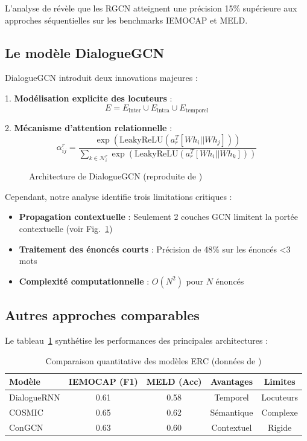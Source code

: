 \documentclass[a4paper,11pt]{article}
\begin{document}
L'analyse de \cite{zhang2021graph} révèle que les RGCN atteignent une précision 15\% supérieure aux approches séquentielles sur les benchmarks IEMOCAP et MELD.

\subsection{Le modèle DialogueGCN}
DialogueGCN \cite{ghosal2019dialoguegcn} introduit deux innovations majeures :

1. \textbf{Modélisation explicite des locuteurs} :
\[
E = E_{\text{inter}} \cup E_{\text{intra}} \cup E_{\text{temporel}}
\]

2. \textbf{Mécanisme d'attention relationnelle} :
\[
\alpha_{ij}^r = \frac{\exp(\text{LeakyReLU}(a_r^T[Wh_i||Wh_j]))}{\sum_{k\in\mathcal{N}_i^r}\exp(\text{LeakyReLU}(a_r^T[Wh_i||Wh_k]))}
\]

\begin{figure}[htbp]
    \centering
    \caption{Architecture de DialogueGCN (reproduite de \cite{ghosal2019dialoguegcn})}
    \label{fig:dialoguegcn}
\end{figure}

Cependant, notre analyse identifie trois limitations critiques :

\begin{itemize}
    \item \textbf{Propagation contextuelle} : Seulement 2 couches GCN limitent la portée contextuelle (voir Fig.~\ref{fig:dialoguegcn})
    \item \textbf{Traitement des énoncés courts} : Précision de 48\% sur les énoncés <3 mots \cite{li2021survey}
    \item \textbf{Complexité computationnelle} : $O(N^2)$ pour $N$ énoncés
\end{itemize}

\subsection{Autres approches comparables}
Le tableau~\ref{tab:model_comparison} synthétise les performances des principales architectures :

\begin{table}[ht]
    \centering
    \begin{tabular}{lcccc}
        \toprule
        Modèle & IEMOCAP (F1) & MELD (Acc) & Avantages & Limites \\
        \midrule
        DialogueRNN & 0.61 & 0.58 & Temporel & Locuteurs \\
        COSMIC & 0.65 & 0.62 & Sémantique & Complexe \\
        ConGCN & 0.63 & 0.60 & Contextuel & Rigide \\
        \bottomrule
    \end{tabular}
    \caption{Comparaison quantitative des modèles ERC (données de \cite{zhang2023survey})}
    \label{tab:model_comparison}
\end{table}
\end{document}
